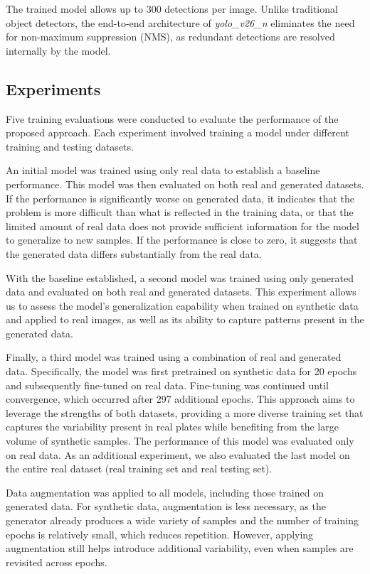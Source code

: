 \documentclass[runningheads]{llncs}
\begin{document}
The trained model allows up to 300 detections per image. Unlike traditional object detectors, the end-to-end architecture of \textit{yolo\_v26\_n} eliminates the need for non-maximum suppression (NMS), as redundant detections are resolved internally by the model.

\subsection{Experiments}

Five training evaluations were conducted to evaluate the performance of the proposed approach. Each experiment involved training a model under different training and testing datasets.

An initial model was trained using only real data to establish a baseline performance. This model was then evaluated on both real and generated datasets. If the performance is significantly worse on generated data, it indicates that the problem is more difficult than what is reflected in the training data, or that the limited amount of real data does not provide sufficient information for the model to generalize to new samples. If the performance is close to zero, it suggests that the generated data differs substantially from the real data.

With the baseline established, a second model was trained using only generated data and evaluated on both real and generated datasets. This experiment allows us to assess the model’s generalization capability when trained on synthetic data and applied to real images, as well as its ability to capture patterns present in the generated data.

Finally, a third model was trained using a combination of real and generated data. Specifically, the model was first pretrained on synthetic data for 20 epochs and subsequently fine-tuned on real data. Fine-tuning was continued until convergence, which occurred after 297 additional epochs. This approach aims to leverage the strengths of both datasets, providing a more diverse training set that captures the variability present in real plates while benefiting from the large volume of synthetic samples. The performance of this model was evaluated only on real data. As an additional experiment, we also evaluated the last model on the entire real dataset (real training set and real testing set). 

Data augmentation was applied to all models, including those trained on generated data. For synthetic data, augmentation is less necessary, as the generator already produces a wide variety of samples and the number of training epochs is relatively small, which reduces repetition. However, applying augmentation still helps introduce additional variability, even when samples are revisited across epochs.
\end{document}
